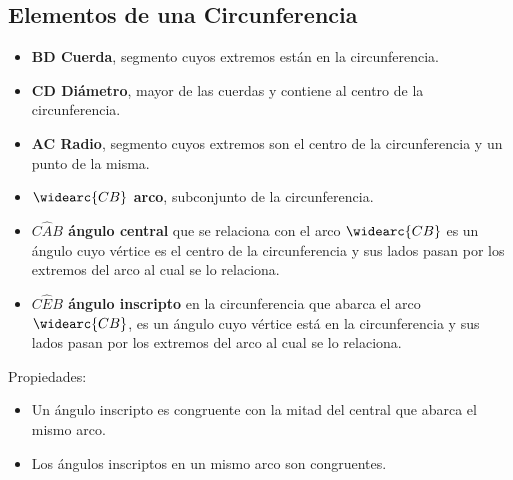 \documentclass[10pt]{article}
\begin{document}
\subsection{Elementos de una Circunferencia}
\begin{multicols}{2}
\begin{itemize}
\item \textbf{BD Cuerda}, segmento cuyos extremos están en la circunferencia.
\item \textbf{CD Diámetro}, mayor de las cuerdas y contiene al centro de la circunferencia.
\item \textbf{AC Radio}, segmento cuyos extremos son el centro de la circunferencia y un punto de la misma.
\item \textbf{$\widearc{CB}$ arco}, subconjunto de la circunferencia.
\end{itemize}
\end{multicols}
\begin{itemize}
\item \textbf{$C\hat{A}B$ ángulo central} que se relaciona con el arco $\widearc{CB}$ es un ángulo cuyo vértice es el centro de la circunferencia y sus lados pasan por los extremos del arco al cual se lo relaciona.
\item \textbf{$C\hat{E}B$ ángulo inscripto} en la circunferencia que abarca el arco $\widearc{CB}$, es un ángulo cuyo vértice está en la circunferencia y sus lados pasan por los extremos del arco al cual se lo relaciona.
\end{itemize}
Propiedades:
\begin{itemize}
\item {} Un ángulo inscripto es congruente con la mitad del central que abarca el mismo arco.
\item {} Los ángulos inscriptos en un mismo arco son congruentes.\\
\end{itemize}
\newpage
\end{document}
